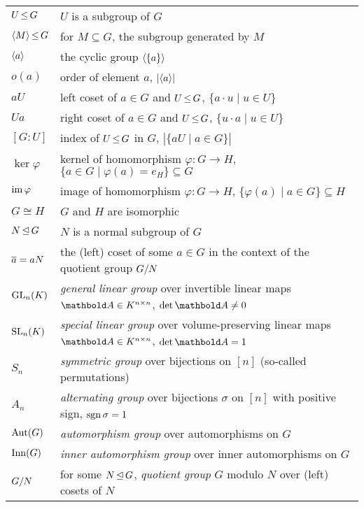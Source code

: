 \begin{fullwidth}
\section*{}
\begin{longtable}{p{2cm}l}
    $U \operatorname*{\leq} G$ & $U$ is a subgroup of $G$ \\
    $\langle M \rangle \operatorname*{\leq} G$ & for $M \subseteq G$, the subgroup generated by $M$ \\
    $\langle a \rangle$ & the cyclic group $\langle \{a\} \rangle$ \\
    $o(a)$ & order of element $a$, $|\langle a \rangle|$ \\
    $aU$ & left coset of $a \in G$ and $U \operatorname*{\leq} G$, $\{a \cdot u \mid u \in U\}$ \\
    $Ua$ & right coset of $a \in G$ and $U \operatorname*{\leq} G$, $\{u \cdot a \mid u \in U\}$ \\
    $[G:U]$ & index of $U \operatorname*{\leq} G$ in $G$, $|\{aU \mid a \in G\}|$ \\
    $\ker \varphi$ & kernel of homomorphism $\varphi : G \to H$, $\{a \in G \mid \varphi(a) = e_H\} \subseteq G$ \\
    $\operatorname*{im} \varphi$ & image of homomorphism $\varphi : G \to H$, $\{\varphi(a) \mid a \in G\} \subseteq H$ \\
    $G \cong H$ & $G$ and $H$ are isomorphic \\
    $N \operatorname*{\trianglelefteq} G$ & $N$ is a normal subgroup of $G$ \\
    $\overline{a} = a N$ & the (left) coset of some $a \in G$ in the context of the quotient group $G/N$ \\
    \addlinespace
    $\mathrm{GL}_{n}(K)$ & \emph{general linear group} over invertible linear maps $\mA \in K^{n \times n}$, $\det{\mA} \neq 0$ \\
    $\mathrm{SL}_{n}(K)$ & \emph{special linear group} over volume-preserving linear maps $\mA \in K^{n \times n}$, $\det{\mA} = 1$ \\
    $S_n$ & \emph{symmetric group} over bijections on $[n]$ (so-called permutations) \\
    $A_n$ & \emph{alternating group} over bijections $\sigma$ on $[n]$ with positive sign, $\operatorname*{sgn}{\sigma} = 1$ \\
    $\mathrm{Aut}(G)$ & \emph{automorphism group} over automorphisms on $G$ \\
    $\mathrm{Inn}(G)$ & \emph{inner automorphism group} over inner automorphisms on $G$ \\
    $G/N$ & for some $N \operatorname*{\trianglelefteq} G$, \emph{quotient group} $G$ modulo $N$ over (left) cosets of $N$ \\

\end{longtable}
\end{fullwidth}

